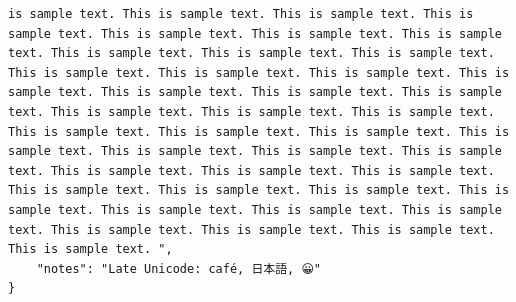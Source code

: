 \documentclass[11pt,a4paper]{article}
\begin{document}
\begin{verbatim}
is sample text. This is sample text. This is sample text. This is sample text. This is sample text. This is sample text. This is sample text. This is sample text. This is sample text. This is sample text. This is sample text. This is sample text. This is sample text. This is sample text. This is sample text. This is sample text. This is sample text. This is sample text. This is sample text. This is sample text. This is sample text. This is sample text. This is sample text. This is sample text. This is sample text. This is sample text. This is sample text. This is sample text. This is sample text. This is sample text. This is sample text. This is sample text. This is sample text. This is sample text. This is sample text. This is sample text. This is sample text. This is sample text. This is sample text. This is sample text. This is sample text. ",
    "notes": "Late Unicode: café, 日本語, 😀"
}
\end{verbatim}
\end{document}
